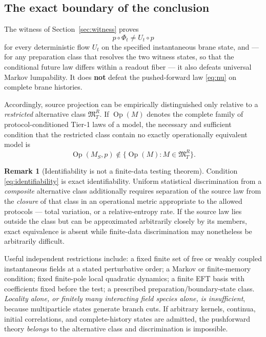 \documentclass[11pt,a4paper]{article}
\theoremstyle{plain}
\theoremstyle{definition}
\newtheorem{remark}[theorem]{Remark}
\newcommand{\Op}{\operatorname{Op}}
\begin{document}
\subsection{The exact boundary of the conclusion}
\label{sec:boundary}

The witness of Section~\ref{sec:witness} proves
\begin{equation}
\label{eq:noflow}
p\circ\Phi_t\ne U_t\circ p
\end{equation}
for every deterministic flow $U_t$ on the specified instantaneous brane
state, and --- for any preparation class that resolves the two witness
states, so that the conditional future law differs within a readout fiber
--- it also defeats universal Markov lumpability. It does
\textbf{not} defeat the pushed-forward law \eqref{eq:nu} on complete
brane histories.

Accordingly, source projection can be empirically distinguished only
relative to a \emph{restricted} alternative class $\mathfrak M^R_T$. If
$\Op(M)$ denotes the complete family of protocol-conditioned Tier-1 laws
of a model, the necessary and sufficient condition that the restricted
class contain no exactly operationally equivalent model is
\begin{equation}
\label{eq:identifiability}
\boxed{\;
\Op(M_S,p)\notin\bigl\{\Op(M):M\in\mathfrak M^R_T\bigr\}.
\;}
\end{equation}

\begin{remark}[Identifiability is not a finite-data testing theorem]
\label{rem:finitedata}
Condition \eqref{eq:identifiability} is exact identifiability. Uniform
statistical discrimination from a \emph{composite} alternative class
additionally requires separation of the source law from the
\emph{closure} of that class in an operational metric appropriate to the
allowed protocols --- total variation, or a relative-entropy rate. If the
source law lies outside the class but can be approximated arbitrarily
closely by its members, exact equivalence is absent while finite-data
discrimination may nonetheless be arbitrarily difficult.
\end{remark}

Useful independent restrictions include: a fixed finite set of free or
weakly coupled instantaneous fields at a stated perturbative order; a
Markov or finite-memory condition; fixed finite-pole local quadratic
dynamics; a finite EFT basis with coefficients fixed before the test; a
prescribed preparation/boundary-state class. \emph{Locality alone, or
finitely many interacting field species alone, is insufficient}, because
multiparticle states generate branch cuts. If arbitrary kernels,
continua, initial correlations, and complete-history states are admitted,
the pushforward theory \emph{belongs} to the alternative class and
discrimination is impossible.
\end{document}
